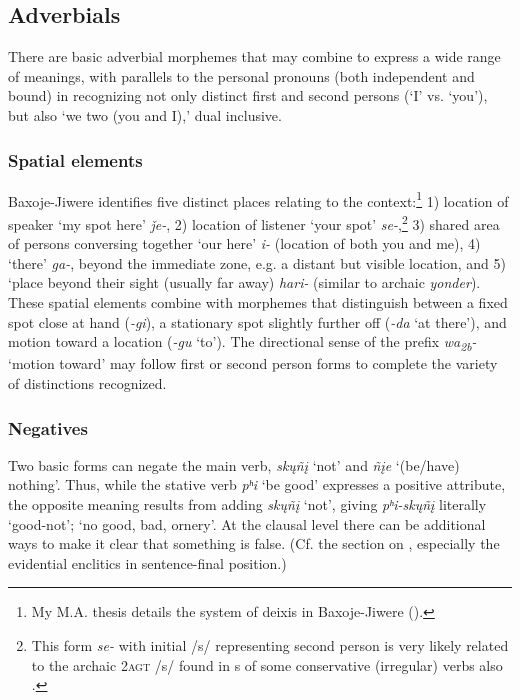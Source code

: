 \documentclass[output=paper]{LSP/langsci}
\begin{document}
\subsection{Adverbials}
There are basic adverbial morphemes that may combine to express a wide range of meanings, with parallels to the personal pronouns (both independent and bound) in recognizing not only distinct first and second persons (`I' vs. `you'), but also `we two (you and I),' dual inclusive.  

\subsubsection{Spatial elements}   

Baxoje-Jiwere identifies five distinct places relating to the  context:\footnote{My M.A. thesis details the system of deixis in Baxoje-Jiwere (\citealt{Hopkins1988}).} 1) location of speaker `my spot here' \textit{\v{j}e-},  2) location of  listener `your spot' \textit{se-},\footnote{This form \textit{se-} with initial /s/ representing second person is very likely related to the archaic \textsc{2agt} /s/ found in s of some conservative (irregular) verbs also \citep[480]{Rankin2005b}.}  3) shared area of persons conversing together `our here' \textit{i-} (location of both you and me),  4) `there' \textit{ga-}, beyond the immediate  zone, e.g. a distant but visible location, and 5) `place beyond their sight (usually far away) \textit{hari-} (similar to archaic  \textit{yonder}).  These spatial elements combine with morphemes that distinguish between a fixed spot close at hand (\textit{-gi}), a stationary spot slightly further off (\textit{-da} `at there'), and motion toward a location (\textit{-gu} `to').  The directional sense of the prefix \textit{wa\textsubscript{2b}-} `motion toward' may follow first or second person forms to complete the variety of distinctions recognized. 
	
\subsubsection{Negatives} 

 Two basic forms can negate the main verb, \textit{sk\k{u}ñ\k{i}} `not' and \textit{ñ\k{i}e} `(be/have) nothing'.  Thus, while the stative verb \textit{pʰi} `be good' expresses a positive attribute, the opposite meaning results from adding \textit{sk\k{u}ñ\k{i}} `not', giving \textit{pʰi-sk\k{u}ñ\k{i}}  literally `good-not'; `no good, bad, ornery'.  At the clausal level there can be additional ways to make it clear that something is false.  (Cf. the section on , especially the evidential enclitics in sentence-final position.)  
\end{document}
